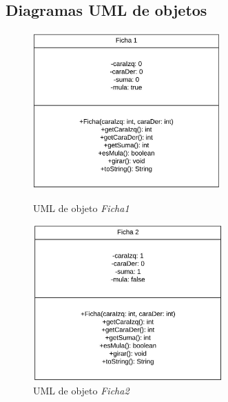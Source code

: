\documentclass[12pt]{article}
\begin{document}
  \subsection{Diagramas UML de objetos}
  \begin{figure}[h!]
    \centering
    \begin{minipage}[l]{0.45\textwidth}
      \centering
      \includegraphics[height=6cm]{umlo1.png}
      \caption{UML de objeto \textit{Ficha1}}
    \end{minipage}
    \begin{minipage}[r]{0.45\textwidth}
      \centering
      \includegraphics[height=6cm]{umlo2.png}
      \caption{UML de objeto \textit{Ficha2}}
    \end{minipage}
  \end{figure}
\end{document}
